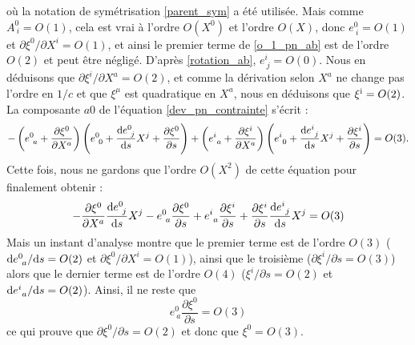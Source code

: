 			où la notation de symétrisation \ref{parent_sym} a été utilisée.
			Mais comme $A^0_{\ i}=O(1)$, cela est vrai à l'ordre $O(X^0)$ et l'ordre $O(X)$, donc $e^0_{\ i}=O(1)$ et $\partial \xi^0/\partial X^i=O(1)$, et ainsi le premier terme de \ref{o_1_pn_ab} est de l'ordre $O(2)$ et peut être négligé. D'après \ref{rotation_ab}, $e^i_{\ j}=O(0)$. Nous en déduisons que $\partial \xi^i/\partial X^a=O(2)$, et comme la dérivation selon $X^a$ ne change pas l'ordre en $1/c$ et que $\xi^\mu$ est quadratique en $X^a$, nous en déduisons que $\xi^{\mathrm{i}}=O(2)$.
			La composante $a0$ de l'équation \ref{dev_pn_contrainte} s'écrit :
			\begin{equation}
				-\left(e^0_{\ a}+\frac{\partial \xi^0}{\partial X^a}\right)\left( e^0_{\ 0}+\frac{\mathrm{d} e^0_{\ j}}{\mathrm{d} s}X^j +\frac{\partial \xi^0}{\partial s} \right)
				+\left( e^i_{\ a} + \frac{\partial \xi^i}{\partial X^a} \right)\left( e^i_{\ 0} + \frac{\mathrm{d} e^i_{\ j}}{\mathrm{d} s}X^j +\frac{\partial \xi^i}{\partial s} \right) 
				= O(3).
			\end{equation}
			Cette fois, nous ne gardons que l'ordre $O(X^2)$ de cette équation pour finalement obtenir :
			\begin{equation}
				-\frac{\partial \xi^0}{\partial X^a}\frac{\d e^0_{\ j}}{\d s}X^j-e^0_{\ a}\frac{\partial \xi^0}{\partial s} + e^i_{\ a}\frac{\partial \xi^i}{\partial s} + \frac{\partial \xi^i}{\partial s}\frac{\d e^i_{\ j}}{\d s}X^j = O(3)
			\end{equation}
			Mais un instant d'analyse montre que le premier terme est de l'ordre $O(3)$ ($\mathrm{d} e^0_{\ a}/\mathrm{d} s=O(2)$ et $\partial \xi^0/\partial X^i=O(1)$), ainsi que le troisième ($\partial \xi^i/\partial s=O(3)$) alors que le dernier terme est de l'ordre $O(4)$ (\partial $\xi^i/\partial s=O(2)$ et $\mathrm{d} e^i_{\ a}/\mathrm{d} s=O(2)$). Ainsi, il ne reste que
			\begin{equation}
				e^0_{\ a}\frac{\partial \xi^0}{\partial s}=O(3)
			\end{equation}
			ce qui prouve que $\partial \xi^0/\partial s=O(2)$ et donc que $\xi^0=O(3)$. 

